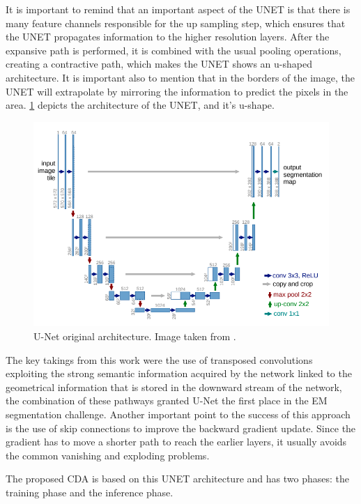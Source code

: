 It is important to remind that an important aspect of the UNET is that there is many feature channels responsible for the up sampling step, which ensures that the UNET propagates information
to the higher resolution layers. After the expansive path is performed, it is combined with the usual pooling operations, creating a contractive path, which makes the UNET shows an u-shaped architecture. 
It is important also to mention that in the borders of the image, the UNET will extrapolate by mirroring the information to predict the pixels in the area. 
\ref{unetimg} depicts the architecture of the UNET, and it's u-shape.

\begin{figure}[H]
    \includegraphics[width=.7\textwidth]{Cap2-Methods/screenshot_1.png}
    \centering
	\caption{U-Net original architecture. Image taken from \cite{unet_gordo}.}
	\label{unetimg}
\end{figure}

The key takings from this work were the use of transposed convolutions exploiting the strong semantic information acquired by the network linked to the geometrical information that is stored in the downward stream of the network, the combination of these pathways granted U-Net the first place in the EM segmentation challenge. Another important point to the success of this approach is the use of skip connections to improve the backward gradient update. Since the gradient has to move a shorter path to reach the earlier layers, it usually avoids the common vanishing and exploding problems.

The proposed CDA is based on this UNET architecture and has two phases: the training phase and the inference phase.

